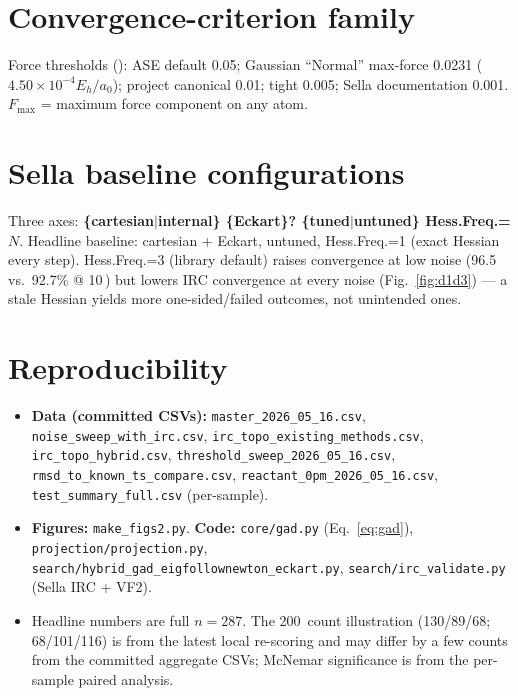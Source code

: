 \documentclass[11pt]{article}
\newcommand{\SI}[2]{#1\,\text{#2}}
\newcommand{\si}[1]{\text{#1}}
\newcommand{\fmax}{\ensuremath{F_{\mathrm{max}}}}
\begin{document}
\section{Convergence-criterion family}\label{app:crit}
Force thresholds (\si{eV/\AA}): ASE default 0.05; Gaussian ``Normal'' max-force
0.0231 ($4.50\!\times\!10^{-4}E_h/a_0$); project canonical 0.01; tight 0.005;
Sella documentation 0.001. \fmax{} = maximum force component on any atom.

\section{Sella baseline configurations}\label{app:sella}
Three axes: \textbf{\{cartesian$|$internal\} \{Eckart\}? \{tuned$|$untuned\}
Hess.Freq.=$N$}. Headline baseline: cartesian + Eckart, untuned, Hess.Freq.=1
(exact Hessian every step). Hess.Freq.=3 (library default) raises convergence at
low noise (96.5 vs.\ 92.7\% @ \SI{10}{pm}) but lowers IRC convergence at every
noise (Fig.~\ref{fig:d1d3}) --- a stale Hessian yields more one-sided/failed
outcomes, not unintended ones.

\section{Reproducibility}\label{app:repro}
{\sloppy
\begin{itemize}
\item \textbf{Data (committed CSVs):} \texttt{master\_2026\_05\_16.csv},
  \texttt{noise\_sweep\_with\_irc.csv}, \texttt{irc\_topo\_existing\_methods.csv},
  \texttt{irc\_topo\_hybrid.csv}, \texttt{threshold\_sweep\_2026\_05\_16.csv},
  \texttt{rmsd\_to\_known\_ts\_compare.csv}, \texttt{reactant\_0pm\_2026\_05\_16.csv},
  \texttt{test\_summary\_full.csv} (per-sample).
\item \textbf{Figures:} \texttt{make\_figs2.py}. \textbf{Code:} \texttt{core/gad.py}
  (Eq.~\ref{eq:gad}), \texttt{projection/projection.py},
  \texttt{search/hybrid\_gad\_eigfollownewton\_eckart.py},
  \texttt{search/irc\_validate.py} (Sella IRC + VF2).
\item Headline numbers are full $n=287$. The \SI{200}{pm} count illustration
  (130/89/68; 68/101/116) is from the latest local re-scoring and may differ by a
  few counts from the committed aggregate CSVs; McNemar significance is from the
  per-sample paired analysis.
\end{itemize}
\par}
\end{document}
